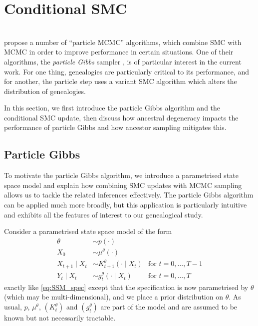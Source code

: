 \section{Conditional SMC}
\label{sec:condSMC}
\\
\textcite{andrieu2010} propose a number of ``particle MCMC'' algorithms, which combine SMC with MCMC in order to improve performance in certain situations.
One of their algorithms, the \emph{particle Gibbs} sampler \parencite[Section 2.4.3]{andrieu2010}, is of particular interest in the current work. For one thing, genealogies are particularly critical to its performance, and for another, the particle step uses a variant SMC algorithm which alters the distribution of genealogies.

In this section, we first introduce the particle Gibbs algorithm and the conditional SMC update, then discuss how ancestral degeneracy impacts the performance of particle Gibbs and how ancestor sampling mitigates this.




\subsection{Particle Gibbs}
\label{sec:particleGibbs}
To motivate the particle Gibbs algorithm, we introduce a parametrised state space model and explain how combining SMC updates with MCMC sampling allows us to tackle the related inferences effectively.
The particle Gibbs algorithm can be applied much more broadly, but this application is particularly intuitive and exhibits all the features of interest to our genealogical study.

Consider a parametrised state space model of the form
\begin{align*}
\theta &\sim p(\cdot) & \\
X_0 &\sim \mu^\theta(\cdot) & \\
X_{t+1} \mid X_{t} &\sim K_{t+1}^\theta(\cdot \mid X_{t}) &\text{for } t=0,\dots, T-1 \\
Y_t \mid X_t &\sim g_t^\theta(\cdot \mid X_t) &\text{for } t=0,\dots, T
\end{align*}
exactly like \eqref{eq:SSM_spec} except that the specification is now parametrised by $\theta$ (which may be multi-dimensional), and we place a prior distribution on $\theta$. 
As usual, $p$, $\mu^\theta$, $(K_t^\theta)$ and $(g_t^\theta)$ are part of the model and are assumed to be known but not necessarily tractable.


